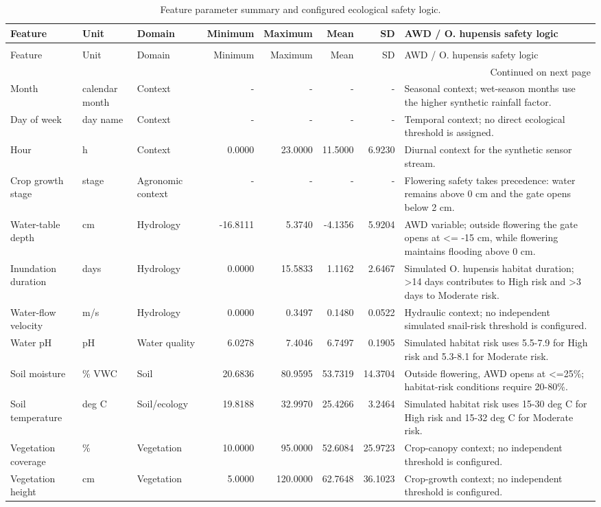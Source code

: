 \begin{longtable}{p{}p{}p{}rrrrp{}}
\caption{Feature parameter summary and configured ecological safety logic.} \label{tab:chapter2-feature-parameters} \\
\toprule
Feature & Unit & Domain & Minimum & Maximum & Mean & SD & AWD / O. hupensis safety logic \\
\midrule
\endfirsthead
\caption[]{Feature parameter summary and configured ecological safety logic.} \\
\toprule
Feature & Unit & Domain & Minimum & Maximum & Mean & SD & AWD / O. hupensis safety logic \\
\midrule
\endhead
\midrule
\multicolumn{8}{r}{Continued on next page} \\
\midrule
\endfoot
\bottomrule
\endlastfoot
Month & calendar month & Context & - & - & - & - & Seasonal context; wet-season months use the higher synthetic rainfall factor. \\
Day of week & day name & Context & - & - & - & - & Temporal context; no direct ecological threshold is assigned. \\
Hour & h & Context & 0.0000 & 23.0000 & 11.5000 & 6.9230 & Diurnal context for the synthetic sensor stream. \\
Crop growth stage & stage & Agronomic context & - & - & - & - & Flowering safety takes precedence: water remains above 0 cm and the gate opens below 2 cm. \\
Water-table depth & cm & Hydrology & -16.8111 & 5.3740 & -4.1356 & 5.9204 & AWD variable; outside flowering the gate opens at <= -15 cm, while flowering maintains flooding above 0 cm. \\
Inundation duration & days & Hydrology & 0.0000 & 15.5833 & 1.1162 & 2.6467 & Simulated O. hupensis habitat duration; >14 days contributes to High risk and >3 days to Moderate risk. \\
Water-flow velocity & m/s & Hydrology & 0.0000 & 0.3497 & 0.1480 & 0.0522 & Hydraulic context; no independent simulated snail-risk threshold is configured. \\
Water pH & pH & Water quality & 6.0278 & 7.4046 & 6.7497 & 0.1905 & Simulated habitat risk uses 5.5-7.9 for High risk and 5.3-8.1 for Moderate risk. \\
Soil moisture & \% VWC & Soil & 20.6836 & 80.9595 & 53.7319 & 14.3704 & Outside flowering, AWD opens at <=25\%; habitat-risk conditions require 20-80\%. \\
Soil temperature & deg C & Soil/ecology & 19.8188 & 32.9970 & 25.4266 & 3.2464 & Simulated habitat risk uses 15-30 deg C for High risk and 15-32 deg C for Moderate risk. \\
Vegetation coverage & \% & Vegetation & 10.0000 & 95.0000 & 52.6084 & 25.9723 & Crop-canopy context; no independent threshold is configured. \\
Vegetation height & cm & Vegetation & 5.0000 & 120.0000 & 62.7648 & 36.1023 & Crop-growth context; no independent threshold is configured. \\
\end{longtable}
